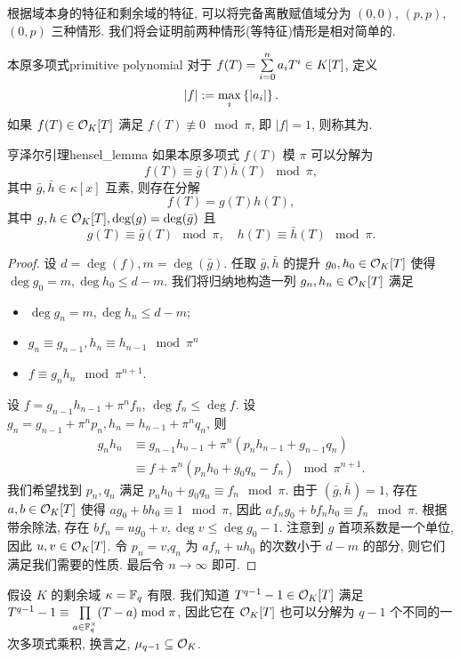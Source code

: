 	
根据域本身的特征和剩余域的特征, 可以将完备离散赋值域分为 $(0,0)$, $(p,p)$, $(0,p)$ 三种情形. 我们将会证明前两种情形(等特征)情形是相对简单的.

\begin{definition}{本原多项式}{primitive polynomial}
对于 $f(T)=\sum\limits_{i=0}^n a_i T^i\in K[T]$, 定义
  \[|f|:=\max_i\left\{|a_i|\right\}.\]
如果 $f(T)\in{\mathcal{O}}_K[T]$ 满足 $f(T)\not\equiv 0\mod\pi$, 即 $|f|=1$, 则称其为. 
\end{definition}

\begin{lemma}{亨泽尔引理}{hensel_lemma}
如果本原多项式 $f(T)$ 模 $\pi$ 可以分解为
  \[f(T)\equiv \bar g(T)\bar h(T)\mod\pi,\]
其中 $\bar g,\bar h\in \kappa[x]$ 互素, 则存在分解
  \[f(T)=g(T)h(T),\]
其中 $g,h\in {\mathcal{O}}_K[T],\deg(g)=\deg(\bar g)$ 且
  \[g(T)\equiv\bar g(T)\mod \pi,\quad h(T)\equiv \bar h(T)\mod \pi.\]
\end{lemma}
\begin{proof}
设 $d=\deg (f),m=\deg(\bar g)$. 任取 $\bar g,\bar h $ 的提升 $g_0,h_0\in{\mathcal{O}}_K[T]$ 使得 $\deg g_0=m,\deg h_0\le d-m$. 我们将归纳地构造一列 $g_n,h_n\in{\mathcal{O}}_K[T]$ 满足
\begin{itemize}
\item $\deg g_n=m,\deg h_n\le d-m$;
\item $g_n\equiv g_{n-1},h_n\equiv h_{n-1}\mod \pi^n$
\item $f\equiv g_nh_n\mod\pi^{n+1}$.
\end{itemize}
设 $f=g_{n-1}h_{n-1}+\pi^n f_n$, $\deg f_n\le \deg f$. 设 $g_n=g_{n-1}+\pi^n p_n,h_n=h_{n-1}+\pi^n q_n$, 则
  \[\begin{split}
g_nh_n&\equiv g_{n-1}h_{n-1}+\pi^n(p_n h_{n-1}+g_{n-1}q_n)\\
&\equiv f+\pi^n(p_n h_0+g_0 q_n-f_n)\mod \pi^{n+1}.
\end{split}\]
我们希望找到 $p_n,q_n$ 满足 $p_n h_0+g_0 q_n\equiv f_n\mod\pi$.
由于 $(\bar g,\bar h)=1$, 存在 $a,b\in{\mathcal{O}}_K[T]$ 使得 $ag_0+bh_0\equiv 1\mod \pi$, 因此 $af_n g_0+bf_nh_0\equiv f_n\mod \pi$. 根据带余除法, 存在 $bf_n=ug_0+v,\deg v\le \deg g_0-1$. 注意到 $g$ 首项系数是一个单位, 因此 $u,v\in{\mathcal{O}}_K[T]$. 令 $p_n=v$,$q_n$ 为 $af_n+uh_0$ 的次数小于 $d-m$ 的部分, 则它们满足我们需要的性质. 最后令 $n\to \infty$ 即可.
\end{proof}

\begin{example}
假设 $K$ 的剩余域 $\kappa={\mathbb{F}}_q$ 有限.
我们知道 $T^{q-1}-1\in{\mathcal{O}}_K[T]$ 满足 $T^{q-1}-1\equiv \prod\limits_{a\in{\mathbb{F}}_q^\times}(T-a)\bmod \pi$, 因此它在 ${\mathcal{O}}_K[T]$ 也可以分解为 $q-1$ 个不同的一次多项式乘积, 换言之, $\mu_{q-1}\subseteq {\mathcal{O}}_K$.
\end{example}

